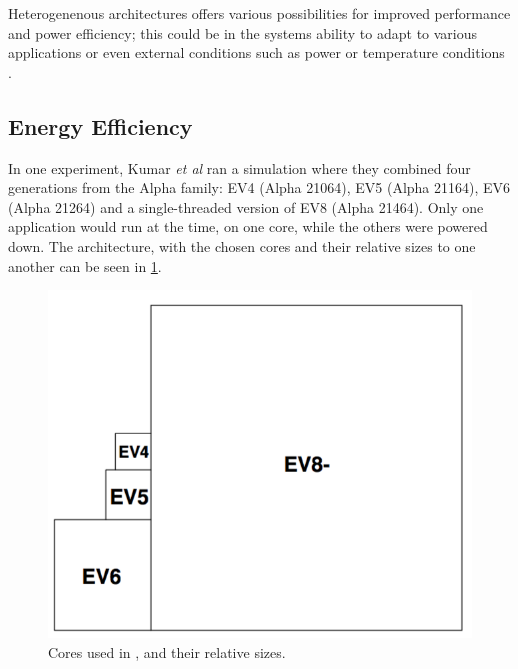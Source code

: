 Heterogenenous architectures offers various possibilities for improved performance and power efficiency;
this could be in the systems ability to adapt to various applications or even external conditions such as
power or temperature conditions \cite{heterogeneous-ee, heterogeneous-perf, heterogeneous-arch}.


\subsection{Energy Efficiency}
\label{subsec:rw_ee} 
In one experiment, Kumar \textit{et al}\cite{heterogeneous-ee} ran a simulation where they combined four generations from the Alpha family: EV4 (Alpha 21064), EV5 (Alpha 21164), EV6 (Alpha 21264) and a single-threaded version of EV8 (Alpha 21464).
Only one application would run at the time, on one core, while the others were powered down.
The architecture, with the chosen cores and their relative sizes to one another can be seen in 
\ref{fig:Kumar1}.

\begin{figure}[htb]
    \centering
    \includegraphics[width=1.0\textwidth]{Figures/Heterogeneous/Kumar1}
    \caption{Cores used in \cite{heterogeneous-ee}, and their relative sizes.}
    \label{fig:Kumar1}
\end{figure}


